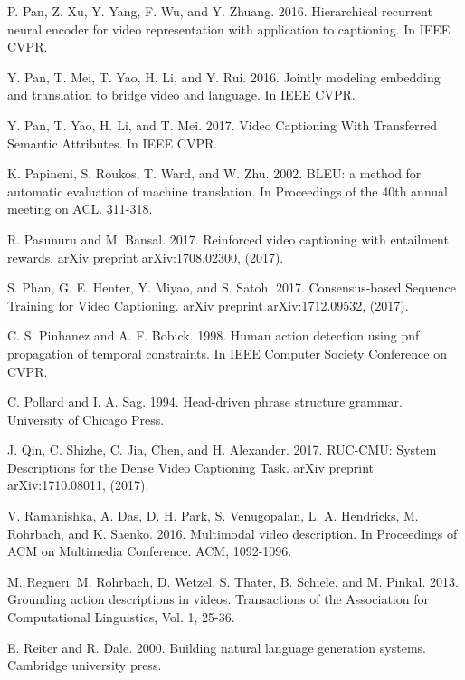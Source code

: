 \documentclass[10pt,journal,compsoc]{IEEEtran}
\begin{document}
\begin{thebibliography}{1}
P. Pan, Z. Xu, Y. Yang, F. Wu, and Y. Zhuang. 2016. Hierarchical recurrent neural encoder for video representation with application to captioning. In IEEE CVPR.

Y. Pan, T. Mei, T. Yao, H. Li, and Y. Rui. 2016. Jointly modeling embedding and translation to bridge video and language. In IEEE CVPR.

Y. Pan, T. Yao, H. Li, and T. Mei. 2017. Video Captioning With Transferred Semantic Attributes. In IEEE CVPR.

K. Papineni, S. Roukos, T. Ward, and W. Zhu. 2002. BLEU: a method for automatic evaluation of machine translation. In Proceedings of the 40th annual meeting on ACL. 311-318.

R. Pasunuru and M. Bansal. 2017. Reinforced video captioning with entailment rewards. arXiv preprint arXiv:1708.02300, (2017).

S. Phan, G. E. Henter, Y. Miyao, and S. Satoh. 2017. Consensus-based Sequence Training for
Video Captioning. arXiv preprint arXiv:1712.09532, (2017).

C. S. Pinhanez and A. F. Bobick. 1998. Human action detection using pnf propagation of temporal constraints. In IEEE Computer Society Conference on CVPR.

C. Pollard and I. A. Sag. 1994. Head-driven phrase structure grammar. University of Chicago Press.

J. Qin, C. Shizhe, C. Jia, Chen, and H. Alexander. 2017. RUC-CMU: System Descriptions for the
Dense Video Captioning Task. arXiv preprint arXiv:1710.08011, (2017).

V. Ramanishka, A. Das, D. H. Park, S. Venugopalan, L. A. Hendricks, M. Rohrbach, and K. Saenko. 2016. Multimodal video description. In Proceedings of ACM on Multimedia Conference. ACM, 1092-1096.

M. Regneri, M. Rohrbach, D. Wetzel, S. Thater, B. Schiele, and M. Pinkal. 2013.
Grounding action descriptions in videos. Transactions of the Association for Computational Linguistics, Vol. 1, 25-36.

E. Reiter and R. Dale. 2000. Building natural language generation systems. Cambridge university press.


\end{thebibliography}
\end{document}
